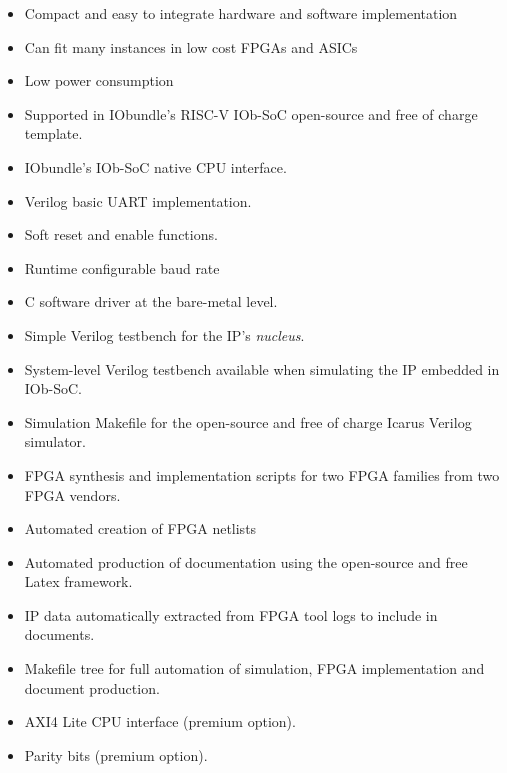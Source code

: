 %

\begin{itemize}
\item Compact and easy to integrate hardware and software implementation
\item Can fit many instances in low cost FPGAs and ASICs
\item Low power consumption
\item Supported in IObundle's RISC-V IOb-SoC open-source and free of charge template.
\item IObundle's IOb-SoC native CPU interface.
\item Verilog basic UART implementation.
\item Soft reset and enable functions.
\item Runtime configurable baud rate
\item C software driver at the bare-metal level.
\item Simple Verilog testbench for the IP's {\em nucleus}.
\item System-level Verilog testbench available when simulating the IP embedded in IOb-SoC.
\item Simulation Makefile for the open-source and free of charge Icarus Verilog simulator.
\item FPGA synthesis and implementation scripts for two FPGA families from two FPGA vendors.
\item Automated creation of FPGA netlists
\item Automated production of documentation using the open-source and free Latex framework.
\item IP data automatically extracted from FPGA tool logs to include in documents.
\item Makefile tree for full automation of simulation, FPGA implementation and document production.
\item AXI4 Lite CPU interface (premium option).
\item Parity bits  (premium option).
\end{itemize}
